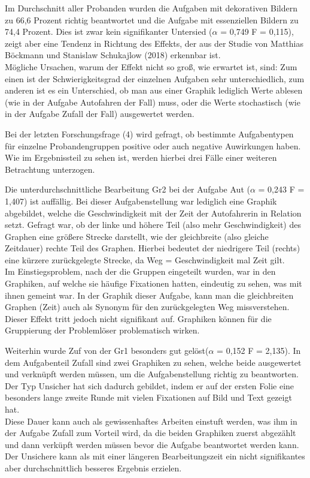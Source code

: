 Im Durchschnitt aller Probanden wurden die Aufgaben mit dekorativen Bildern zu 66,6 Prozent richtig beantwortet und die Aufgabe mit essenziellen Bildern zu 74,4 Prozent. Dies ist zwar kein signifikanter Untersied ($\alpha$ = 0,749 F = 0,115), zeigt aber eine Tendenz in Richtung des Effekts, der aus der Studie von Matthias Böckmann und Stanislaw Schukajlow (2018) erkennbar ist. \\Mögliche Ursachen, warum der Effekt nicht so groß, wie erwartet ist, sind: Zum einen ist der Schwierigkeitsgrad der einzelnen Aufgaben sehr unterschiedlich, zum anderen ist es ein Unterschied, ob man aus einer Graphik lediglich Werte ablesen (wie in der Aufgabe Autofahren der Fall) muss, oder die Werte stochastisch (wie in der Aufgabe Zufall der Fall) ausgewertet werden.


Bei der letzten Forschungsfrage (4) wird gefragt, ob bestimmte Aufgabentypen für einzelne Probandengruppen positive oder auch negative Auwirkungen haben. Wie im Ergebnissteil zu sehen ist, werden hierbei drei Fälle einer weiteren Betrachtung unterzogen. 


Die unterdurchschnittliche Bearbeitung \gls{Gr2} bei der Aufgabe \gls{Aut} ($\alpha$ = 0,243 F = 1,407) ist auffällig. Bei dieser Aufgabenstellung war lediglich eine Graphik abgebildet, welche die Geschwindigkeit mit der Zeit der Autofahrerin in Relation setzt. Gefragt war, ob der linke und höhere Teil (also mehr Geschwindigkeit)  des Graphen eine größere Strecke darstellt, wie der gleichbreite (also gleiche Zeitdauer) rechte Teil des Graphen.  Hierbei bedeutet der niedrigere Teil (rechts) eine kürzere zurückgelegte Strecke, da  Weg = Geschwindigkeit mal Zeit gilt. \\
Im Einstiegsproblem, nach der die Gruppen eingeteilt wurden, war in den Graphiken, auf welche sie häufige Fixationen hatten, eindeutig zu sehen, was mit ihnen gemeint war. In der Graphik dieser Aufgabe, kann man die gleichbreiten Graphen (Zeit) auch als Synonym für den zurückgelegten Weg missverstehen. Dieser Effekt tritt jedoch nicht signifikant auf. Graphiken können für die Gruppierung der Problemlöser problematisch wirken.


Weiterhin wurde \gls{Zuf} von der \gls{Gr1} besonders gut gelöst($\alpha$ = 0,152 F = 2,135). In dem Aufgabenteil Zufall sind zwei Graphiken zu sehen, welche beide ausgewertet und verknüpft werden müssen, um die Aufgabenstellung richtig zu beantworten. Der Typ Unsicher hat sich dadurch gebildet, indem er auf der ersten Folie eine besonders lange zweite Runde mit vielen Fixationen auf Bild und Text gezeigt hat. \\
Diese Dauer kann auch als gewissenhaftes Arbeiten einstuft werden, was ihm in der Aufgabe Zufall zum Vorteil wird, da die beiden Graphiken zuerst abgezählt und dann verküpft werden müssen bevor die Aufgabe beantwortet werden kann. Der Unsichere kann als mit einer längeren Bearbeitungszeit ein nicht signifikantes aber durchschnittlich besseres Ergebnis erzielen. 



